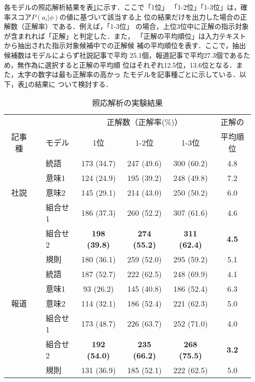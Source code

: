 各モデルの照応解析結果を表\ref{tab:riyousosei}に示す．ここで「1位」
「1-2位」「1-3位」は，確率スコア$P(a_i|\phi)$の値に基づいて該当する上
位の結果だけを出力した場合の正解数（正解率）である．例えば，「1-3位」
の場合，上位3位中に正解の指示対象が含まれれば「正解」と判定した．また，
「正解の平均順位」は入力テキストから抽出された指示対象候補中での正解候
補の平均順位を表す．ここで，抽出候補数はモデルによらず社説記事で平均
25.1個，報道記事で平均27.3個であるため，無作為に選択すると正解の平均順
位はそれぞれ12.5位，13.6位となる．また，太字の数字は最も正解率の高かっ
たモデルを記事種ごとに示している．以下，表\ref{tab:riyousosei}の結果に
ついて検討する．

\begin{table}[htbp]
  \def\baselinestretch{}
  \begin{center}
    \caption{照応解析の実験結果}
    \label{tab:riyousosei}
    \small \smallskip
    \begin{tabular}{cclcccc} \hline\hline
      &&& \multicolumn{3}{c}{正解数（正解率(\%)）} & 正解の\\
      \cline{4-6}
      記事種 && モデル & 1位 & 1-2位 & 1-3位 & 平均順位\\
      \hline
      && 統語 & 173 (34.7) & 247 (49.6) & 300 (60.2) & 4.8\\
      \cline{3-7}
      &&意味1 & 124 (24.9) & 195 (39.2) & 248 (49.8) & 7.2\\
      社説 &&意味2 & 145 (29.1) & 214 (43.0) & 250 (50.2) & 6.0\\
      \cline{3-7}
      &&組合せ1 & 186 (37.3) & 260 (52.2) & 307 (61.6) & 4.6\\
      &&組合せ2 & {\bf 198 (39.8)} & \bf{274 (55.2)} & \bf{311 (62.4)} & {\bf 4.5}\\
      \cline{3-7}
      &&規則 & 180 (36.1) & 259 (52.0) & 295 (59.2) & 5.1\\
      \hline
      && 統語 & 187 (52.7) &  222 (62.5) & 248 (69.9) & 4.1\\
      \cline{3-7}
      &&意味1 & 93 (26.2) &145 (40.8) & 186 (52.4) & 6.3\\
      報道 &&意味2 & 114 (32.1) & 186 (52.4) & 221 (62.3) & 5.0\\
      \cline{3-7}
      &&組合せ1 & 173 (48.7) & 226 (63.7) & 252 (71.0) & 4.0\\
      &&組合せ2 & \bf{192 (54.0)} & {\bf 235 (66.2)} & {\bf 268 (75.5)} & {\bf 3.2}\\
      \cline{3-7}
      &&規則 & 131 (36.9) & 185 (52.1) & 222 (62.5) & 5.0\\
      \hline
    \end{tabular}
  \end{center}
\end{table}

